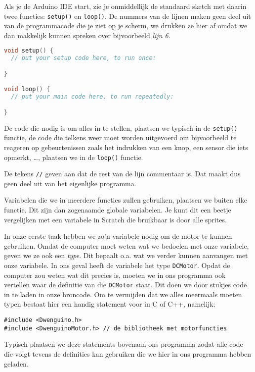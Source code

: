 \documentclass[a4paper, 10pt]{article}
\begin{document}
Als je de Arduino IDE start, zie je onmiddellijk de standaard sketch met daarin twee functies: \texttt{setup()} en \texttt{loop()}.
De nummers van de lijnen maken geen deel uit van de programmacode die je ziet op je scherm, we drukken ze hier af
omdat we dan makkelijk kunnen spreken over bijvoorbeeld {\em lijn 6}.

\begin{lstlisting}[language=C++]
void setup() {
  // put your setup code here, to run once:

}

void loop() {
  // put your main code here, to run repeatedly:

}
\end{lstlisting}

De code die nodig is om alles in te stellen, plaatsen we typisch in de \texttt{setup()} functie, de code die telkens weer moet worden
uitgevoerd om bijvoorbeeld te reageren op gebeurtenissen zoals het indrukken van een knop, een sensor die iets opmerkt,
\ldots, plaatsen we in de \texttt{loop()} functie.

De tekens \texttt{//} geven aan dat de rest van de lijn commentaar is. Dat maakt dus geen deel uit van het eigenlijke
programma.

Variabelen die we in meerdere functies zullen gebruiken, plaatsen we buiten elke functie. Dit zijn dan zogenaamde globale
variabelen. Je kunt dit een beetje vergelijken met een variabele in Scratch die bruikbaar is door alle sprites.

In onze eerste taak hebben we zo'n variabele nodig om de motor te kunnen gebruiken. Omdat de computer moet weten wat we
bedoelen met onze variabele, geven we ze ook een {\em type}. Dit bepaalt o.a. wat we verder kunnen aanvangen met onze
variabele. In ons geval heeft de variabele het type \texttt{DCMotor}. Opdat de computer zou weten wat dit precies is,
moeten we in ons programma ook vertellen waar de definitie van die \texttt{DCMotor} staat. Dit doen we door stukjes code
in te laden in onze broncode. Om te vermijden dat we alles meermaals moeten typen bestaat hier een handig statement voor
in C of C++, namelijk:

\begin{lstlisting}
#include <Dwenguino.h>
#include <DwenguinoMotor.h> // de bibliotheek met motorfuncties
\end{lstlisting}

Typisch plaatsen we deze statements bovenaan ons programma zodat alle code die volgt tevens de definities kan gebruiken
die we hier in ons programma hebben geladen.
\end{document}
